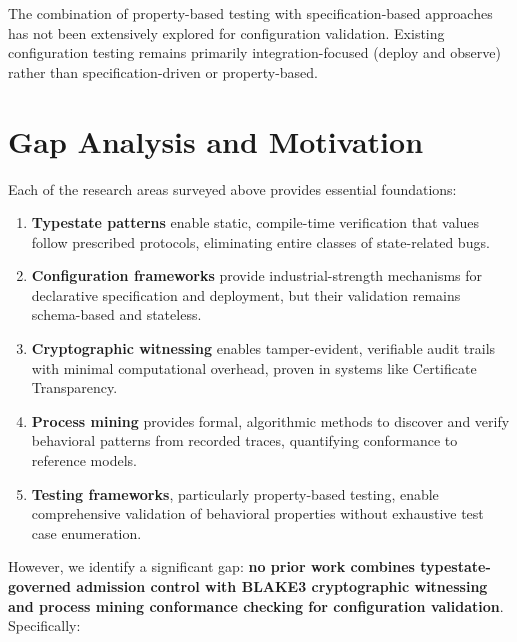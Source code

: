 The combination of property-based testing with specification-based approaches has not been extensively explored for configuration validation. Existing configuration testing remains primarily integration-focused (deploy and observe) rather than specification-driven or property-based.

\section{Gap Analysis and Motivation}

Each of the research areas surveyed above provides essential foundations:

\begin{enumerate}
    \item \textbf{Typestate patterns} enable static, compile-time verification that values follow prescribed protocols, eliminating entire classes of state-related bugs.

    \item \textbf{Configuration frameworks} provide industrial-strength mechanisms for declarative specification and deployment, but their validation remains schema-based and stateless.

    \item \textbf{Cryptographic witnessing} enables tamper-evident, verifiable audit trails with minimal computational overhead, proven in systems like Certificate Transparency.

    \item \textbf{Process mining} provides formal, algorithmic methods to discover and verify behavioral patterns from recorded traces, quantifying conformance to reference models.

    \item \textbf{Testing frameworks}, particularly property-based testing, enable comprehensive validation of behavioral properties without exhaustive test case enumeration.
\end{enumerate}

However, we identify a significant gap: \textbf{no prior work combines typestate-governed admission control with BLAKE3 cryptographic witnessing and process mining conformance checking for configuration validation}. Specifically:

